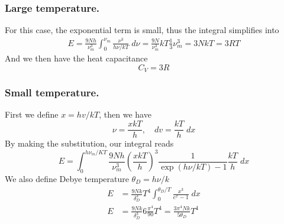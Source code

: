 \documentclass[../../../Main.tex]{subfiles}
\begin{document}
\subsubsection*{Large temperature.} For this case, the exponential term is small, thus the integral simplifies into
\begin{align*}
    E=\frac{9Nh}{\nu_m^3}\int_{0}^{\nu_m}\frac{\nu^3}{h\nu/kT}\;d\nu= \frac{9N}{\nu_m^3}kT\frac{1}{3}\nu_m^3=3NkT=3RT
\end{align*}
And we then have the heat capacitance 
\begin{equation*}
    C_V=3R
\end{equation*}

\subsubsection*{Small temperature.} First we define $x=hv/kT$, then we have 
\begin{equation*}
    \nu=\frac{xkT}{h},\quad dv=\frac{kT}{h}\;dx
\end{equation*}
By making the substitution, our integral reads 
\begin{equation*}
    E=\int_{0}^{h\nu_m/KT}\frac{9Nh}{\nu_m^3}\left(\frac{xkT}{h}\right)^3\frac{1}{\exp(h\nu/kT)-1}\frac{kT}{h}\;dx
\end{equation*}
We also define Debye temperature $\theta_D=h\nu/k$
\begin{align*}
    E&=\frac{9Nk}{\delta_D^3}T^4\int_{0}^{\theta_D/T}\frac{x^3}{e^x-1}\;dx\\
    E&=\frac{9Nk}{\delta_D^3}6\frac{\pi^4}{90}T^4=\frac{3\pi^4Nk}{5\theta_D}T^4
\end{align*}
\end{document}
